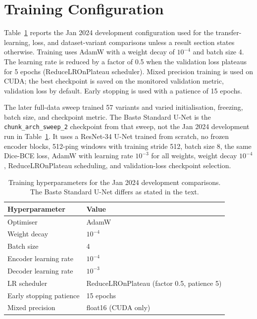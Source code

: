\section{Training Configuration}

Table~\ref{tab:hyperparameters} reports the Jan 2024 development configuration used for the transfer-learning, loss, and dataset-variant comparisons unless a result section states otherwise. Training uses AdamW \cite{loshchilov_decoupled_2019} with a weight decay of $10^{-4}$ and batch size 4. The learning rate is reduced by a factor of 0.5 when the validation loss plateaus for 5 epochs (ReduceLROnPlateau scheduler). Mixed precision training is used on CUDA; the best checkpoint is saved on the monitored validation metric, validation loss by default. Early stopping is used with a patience of 15 epochs.

The later full-data sweep trained 57 variants and varied initialisation, freezing, batch size, and checkpoint metric. The Bast\o{} Standard U-Net is the \texttt{chunk\_arch\_sweep\_2} checkpoint from that sweep, not the Jan 2024 development run in Table~\ref{tab:hyperparameters}. It uses a ResNet-34 U-Net trained from scratch, no frozen encoder blocks, 512-ping windows with training stride 512, batch size 8, the same Dice-BCE loss, AdamW with learning rate $10^{-3}$ for all weights, weight decay $10^{-4}$, ReduceLROnPlateau scheduling, and validation-loss checkpoint selection.

\begin{table}[htbp]
\centering
\caption{Training hyperparameters for the Jan 2024 development comparisons. The Bast\o{} Standard U-Net differs as stated in the text.}
\label{tab:hyperparameters}
\begin{tabular}{ll}
\toprule
Hyperparameter & Value \\
\midrule
Optimiser & AdamW \\
Weight decay & $10^{-4}$ \\
Batch size & 4 \\
Encoder learning rate & $10^{-4}$ \\
Decoder learning rate & $10^{-3}$ \\
LR scheduler & ReduceLROnPlateau (factor 0.5, patience 5) \\
Early stopping patience & 15 epochs \\
Mixed precision & float16 (CUDA only) \\
\bottomrule
\end{tabular}
\end{table}


